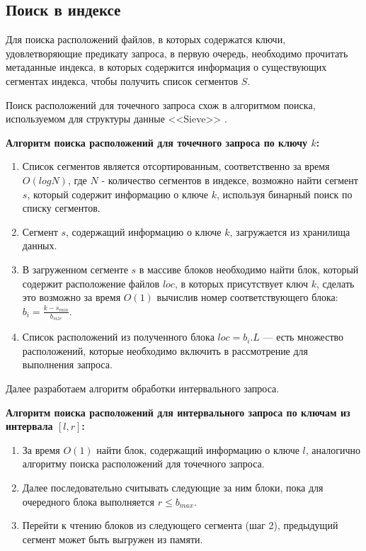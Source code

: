 \subsection{Поиск в индексе}\label{search}

Для поиска расположений файлов, в которых содержатся ключи, удовлетворяющие предикату запроса, в первую очередь, необходимо прочитать метаданные индекса, в которых содержится информация о существующих сегментах индекса, чтобы получить список сегментов $S$.

Поиск расположений для точечного запроса схож в алгоритмом поиска, используемом для структуры данные {<<Sieve>>} \cite{Sieve}.

\textbf{Алгоритм поиска расположений для точечного запроса по ключу $k$:}
\begin{enumerate}
    \item Список сегментов является отсортированным, соответственно за время $O(logN)$, где $N$ - количество сегментов в индексе, возможно найти сегмент $s$, который содержит информацию о ключе $k$, используя бинарный поиск по списку сегментов.
    \item Сегмент $s$, содержащий информацию о ключе $k$, загружается из хранилища данных.
    \item В загруженном сегменте $s$ в массиве блоков необходимо найти блок, который содержит расположение файлов $loc$, в которых присутствует ключ $k$, сделать это возможно за время $O(1)$ вычислив номер соответствующего блока: $b_{i} = \frac{k - s_{min}}{b_{size}}$.
    \item Список расположений из полученного блока $loc = b_{i}.L$ --- есть множество расположений, которые необходимо включить в рассмотрение для выполнения запроса.
\end{enumerate}

Далее разработаем алгоритм обработки интервального запроса.

\textbf{Алгоритм поиска расположений для интервального запроса по ключам из интервала $[l, r]$:}
\begin{enumerate}
    \item За время $O(1)$ найти блок, содержащий информацию о ключе $l$, аналогично алгоритму поиска расположений для точечного запроса.
    \item Далее последовательно считывать следующие за ним блоки, пока для очередного блока выполняется $r \leq b_{max}$.
    \item Перейти к чтению блоков из следующего сегмента (шаг 2), предыдущий сегмент может быть выгружен из памяти.
\end{enumerate}
